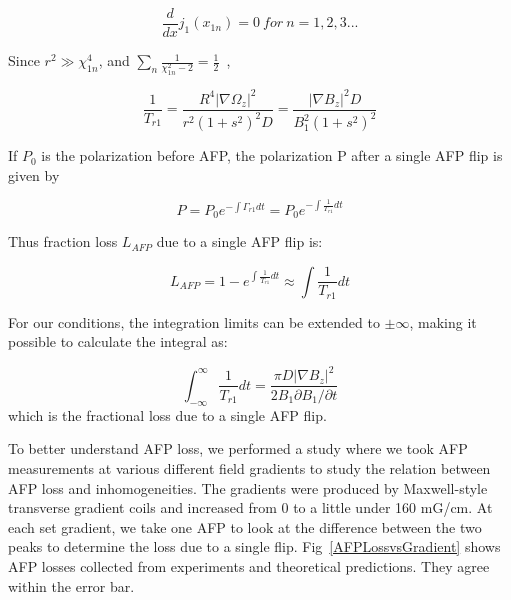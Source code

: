 \begin{equation}
\frac{d}{dx}j_{1}(x_{1n})=0~for~n=1,2,3...
\end{equation}

Since $r^{2}\gg \chi_{1n}^{4}$, and $\sum_{n}\frac{1}{\chi_{1n}^{2}-2}=\frac{1}{2}$~\cite{PhysRevA.37.2877},

\begin{equation}
\frac{1}{T_{r1}}=\frac{R^{4}|\nabla\Omega_{z}|^{2}}{r^{2}(1+s^{2})^{2}D}=\frac{|\nabla B_{z}|^{2}D}{B_1^{2}(1+s^{2})^2}
\end{equation}

If $P_{0}$ is the polarization before AFP, the polarization P after a single AFP flip is given by 

\begin{equation}
P=P_{0}e^{-\int \Gamma_{r1} dt}=P_{0}e^{-\int \frac{1}{T_{r1}}dt}
\end{equation}

Thus fraction loss $L_{AFP}$ due to a single AFP flip is:

\begin{equation}
L_{AFP}=1-e^{\int \frac{1}{T_{r1}} dt} \approx \int \frac{1}{T_{r1}} dt
\end{equation}

For our conditions, the integration limits can be extended to $\pm \infty$, making it possible to calculate the integral as:

\begin{equation}
\int_{-\infty}^{\infty} \frac{1}{T_{r1}}dt=\frac{\pi D|\nabla B_{z}|^{2}}{2B_{1}\partial B_{1}/\partial t}
\end{equation}
which is the fractional loss due to a single AFP flip.

To better understand AFP loss, we performed a study where we took AFP measurements at various different field gradients to study the relation between AFP loss and inhomogeneities. The gradients were produced by Maxwell-style transverse gradient coils and increased from 0 to a little under 160 mG/cm. At each set gradient, we take one AFP to look at the difference between the two peaks to determine the loss due to a single flip. Fig~\ref{AFPLossvsGradient} shows AFP losses collected from experiments and theoretical predictions. They agree within the error bar.

